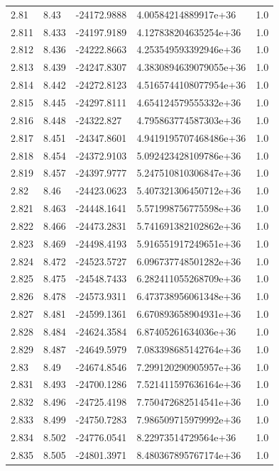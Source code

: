 \begin{tabular}{lllll}
2.81 & 8.43 & -24172.9888 & 4.00584214889917e+36 & 1.0 \\
2.811 & 8.433 & -24197.9189 & 4.127838204635254e+36 & 1.0 \\
2.812 & 8.436 & -24222.8663 & 4.253549593392946e+36 & 1.0 \\
2.813 & 8.439 & -24247.8307 & 4.3830894639079055e+36 & 1.0 \\
2.814 & 8.442 & -24272.8123 & 4.5165744108077954e+36 & 1.0 \\
2.815 & 8.445 & -24297.8111 & 4.654124579555332e+36 & 1.0 \\
2.816 & 8.448 & -24322.827 & 4.795863774587303e+36 & 1.0 \\
2.817 & 8.451 & -24347.8601 & 4.9419195707468486e+36 & 1.0 \\
2.818 & 8.454 & -24372.9103 & 5.092423428109786e+36 & 1.0 \\
2.819 & 8.457 & -24397.9777 & 5.247510810306847e+36 & 1.0 \\
2.82 & 8.46 & -24423.0623 & 5.407321306450712e+36 & 1.0 \\
2.821 & 8.463 & -24448.1641 & 5.571998756775598e+36 & 1.0 \\
2.822 & 8.466 & -24473.2831 & 5.741691382102862e+36 & 1.0 \\
2.823 & 8.469 & -24498.4193 & 5.916551917249651e+36 & 1.0 \\
2.824 & 8.472 & -24523.5727 & 6.096737748501282e+36 & 1.0 \\
2.825 & 8.475 & -24548.7433 & 6.282411055268709e+36 & 1.0 \\
2.826 & 8.478 & -24573.9311 & 6.473738956061348e+36 & 1.0 \\
2.827 & 8.481 & -24599.1361 & 6.670893658904931e+36 & 1.0 \\
2.828 & 8.484 & -24624.3584 & 6.87405261634036e+36 & 1.0 \\
2.829 & 8.487 & -24649.5979 & 7.083398685142764e+36 & 1.0 \\
2.83 & 8.49 & -24674.8546 & 7.299120290905957e+36 & 1.0 \\
2.831 & 8.493 & -24700.1286 & 7.521411597636164e+36 & 1.0 \\
2.832 & 8.496 & -24725.4198 & 7.750472682514541e+36 & 1.0 \\
2.833 & 8.499 & -24750.7283 & 7.986509715979992e+36 & 1.0 \\
2.834 & 8.502 & -24776.0541 & 8.22973514729564e+36 & 1.0 \\
2.835 & 8.505 & -24801.3971 & 8.480367895767174e+36 & 1.0 \\

\end{tabular}
